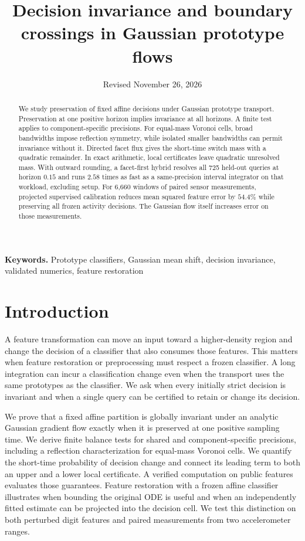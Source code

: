 \documentclass[10pt]{article}
\title{Decision invariance and boundary crossings in Gaussian prototype flows}
\author{}
\date{Revised November 26, 2026}
\begin{document}
\maketitle



\begin{abstract}
We study preservation of fixed affine decisions under Gaussian prototype transport. Preservation at one positive horizon implies invariance at all horizons. A finite test applies to component-specific precisions. For equal-mass Voronoi cells, broad bandwidths impose reflection symmetry, while isolated smaller bandwidths can permit invariance without it. Directed facet flux gives the short-time switch mass with a quadratic remainder. In exact arithmetic, local certificates leave quadratic unresolved mass. With outward rounding, a facet-first hybrid resolves all 725 held-out queries at horizon $0.15$ and runs $2.58$ times as fast as a same-precision interval integrator on that workload, excluding setup. For 6,660 windows of paired sensor measurements, projected supervised calibration reduces mean squared feature error by $54.4\%$ while preserving all frozen activity decisions. The Gaussian flow itself increases error on those measurements.
\end{abstract}

\noindent\textbf{Keywords.} Prototype classifiers, Gaussian mean shift, decision invariance, validated numerics, feature restoration

\section{Introduction}
A feature transformation can move an input toward a higher-density region
and change the decision of a classifier that also consumes those features.
This matters when feature restoration or preprocessing must respect a
frozen classifier. A long integration can incur a classification change
even when the transport uses the same prototypes as the classifier. We ask
when every initially strict decision is invariant and when a single query
can be certified to retain or change its decision.

We prove that a fixed affine partition is globally invariant under an
analytic Gaussian gradient flow exactly when it is preserved at one
positive sampling time. We derive finite balance tests for shared and
component-specific precisions, including a reflection characterization
for equal-mass Voronoi cells. We quantify the short-time probability of
decision change and connect its leading term to both an upper and a
lower local certificate. A verified computation on public features
evaluates those guarantees. Feature restoration with a frozen affine
classifier illustrates when bounding the original ODE is useful and when
an independently fitted estimate can be projected into the decision cell.
We test this distinction on both perturbed digit features and paired
measurements from two accelerometer ranges.
\end{document}
